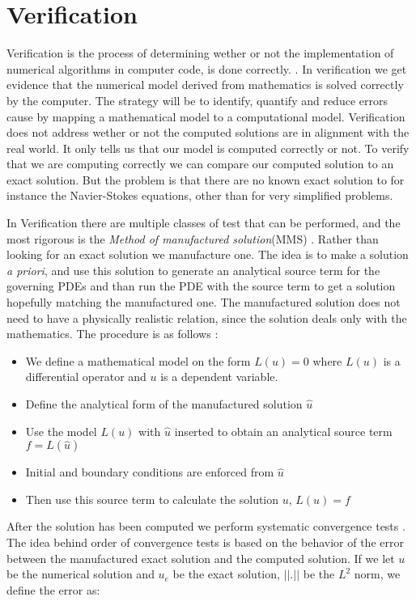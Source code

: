 \section{Verification}
Verification is the process of determining wether or not the implementation of numerical algorithms in computer code, is done correctly. \cite{Oberkampf2010}. 
In verification we get evidence that the numerical model derived from mathematics is solved correctly by the computer. The strategy will be to identify, quantify and reduce errors cause by mapping a mathematical model to a computational model. Verification does not address wether or not the computed solutions are in alignment with the real world. It only tells us that our model is computed correctly or not. To verify that we are computing correctly we can compare our computed solution to an exact solution. But the problem is that there are no known exact solution to for instance the Navier-Stokes equations, other than for very simplified problems. \newline

In Verification there are multiple classes of test that can be performed, and the most rigorous is the \textit{Method of manufactured solution}(MMS) \cite{Oberkampf2010}. Rather than looking for an exact solution we manufacture one. The idea is to make a solution \textit{a priori},  and use this solution to generate an analytical source term for the governing PDEs and than run the PDE with the source term to get a solution hopefully matching the manufactured one. The manufactured solution does not need to have a physically realistic relation, since the solution deals only with the mathematics. 
The procedure is as follows \cite{Oberkampf2010}:
\begin{itemize}
\item We define a mathematical model on the form $ L(u) = 0$ where $L(u)$ is a differential operator and $u$ is a dependent variable.
\item Define the analytical form of the manufactured solution $\hat{u}$
\item Use the model $L(u)$ with $\hat{u}$ inserted to obtain an analytical source term $ f = L(\hat{u}) $
\item Initial and boundary conditions are enforced from $\hat{u}$
\item Then use this source term to calculate the solution $u$, $L(u) = f $
\end{itemize}

After the solution has been computed we perform systematic convergence tests \cite{Roache}. The idea behind order of convergence tests is based on the behavior of the error between the manufactured exact solution and the computed solution. 
If we let $u$ be the numerical solution and $ u_e $ be the exact solution, $|| . ||$ be the $L^2$ norm, we define the error as:

